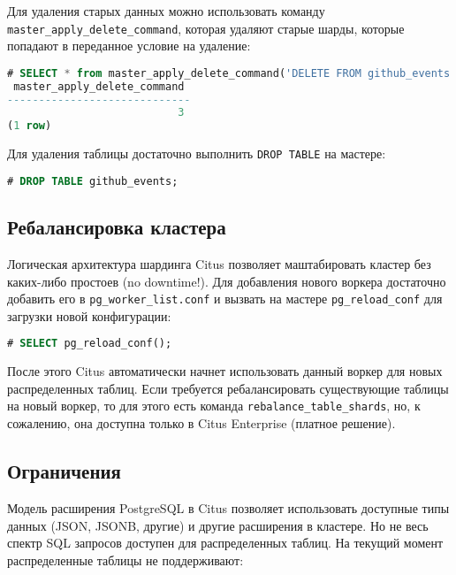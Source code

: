 Для удаления старых данных можно использовать команду \lstinline!master_apply_delete_command!, которая удаляют старые шарды, которые попадают в переданное условие на удаление:

\begin{lstlisting}[language=SQL,label=lst:citus_append4,caption=Удаление старых шардов]
# SELECT * from master_apply_delete_command('DELETE FROM github_events WHERE created_at >= ''2015-01-01 00:00:00''');
 master_apply_delete_command
-----------------------------
                           3
(1 row)
\end{lstlisting}

Для удаления таблицы достаточно выполнить \lstinline!DROP TABLE! на мастере:

\begin{lstlisting}[language=SQL,label=lst:citus_append5,caption=Удаление таблицы]
# DROP TABLE github_events;
\end{lstlisting}



\subsection{Ребалансировка кластера}

Логическая архитектура шардинга Citus позволяет маштабировать кластер без каких-либо простоев (no downtime!). Для добавления нового воркера достаточно добавить его в \lstinline!pg_worker_list.conf! и вызвать на мастере \lstinline!pg_reload_conf! для загрузки новой конфигурации:

\begin{lstlisting}[language=SQL,label=lst:citus_balance1,caption=Загрузка новой конфигурации]
# SELECT pg_reload_conf();
\end{lstlisting}

После этого Citus автоматически начнет использовать данный воркер для новых распределенных таблиц. Если требуется ребалансировать существующие таблицы на новый воркер, то для этого есть команда \lstinline!rebalance_table_shards!, но, к сожалению, она доступна только в Citus Enterprise (платное решение).


\subsection{Ограничения}

Модель расширения PostgreSQL в Citus позволяет использовать доступные типы данных (JSON, JSONB, другие) и другие расширения в кластере. Но не весь спектр SQL запросов доступен для распределенных таблиц. На текущий момент распределенные таблицы не поддерживают:

